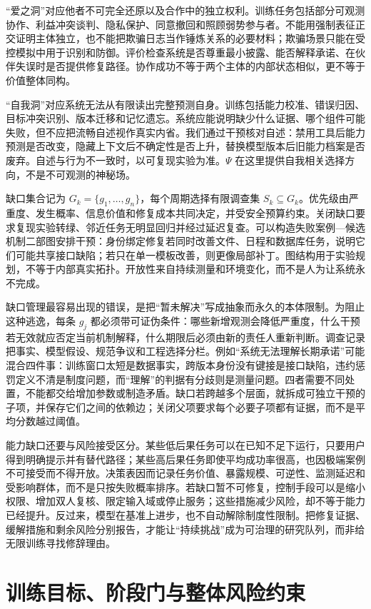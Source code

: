 “爱之洞”对应他者不可完全还原以及合作中的独立权利。训练任务包括部分可观测协作、利益冲突谈判、隐私保护、同意撤回和照顾弱势参与者。不能用强制表征正交证明主体独立，也不能把欺骗日志当作锤炼关系的必要材料；欺骗场景只能在受控模拟中用于识别和防御。评价检查系统是否尊重最小披露、能否解释承诺、在伙伴失误时是否提供修复路径。协作成功不等于两个主体的内部状态相似，更不等于价值整体同构。

“自我洞”对应系统无法从有限读出完整预测自身。训练包括能力校准、错误归因、目标冲突识别、版本迁移和记忆遗忘。系统应能说明缺少什么证据、哪个组件可能失败，但不应把流畅自述视作真实内省。我们通过干预核对自述：禁用工具后能力预测是否改变，隐藏上下文后不确定性是否上升，替换模型版本后旧能力档案是否废弃。自述与行为不一致时，以可复现实验为准。$\Psi$ 在这里提供自我相关选择方向，不是不可观测的神秘场。

缺口集合记为 $G_k=\{g_1,\ldots,g_n\}$，每个周期选择有限调查集 $S_k\subseteq G_k$。优先级由严重度、发生概率、信息价值和修复成本共同决定，并受安全预算约束。关闭缺口要求复现实验转绿、邻近任务无明显回归并经过延迟复查。可以构造失败案例—候选机制二部图安排干预：身份绑定修复若同时改善文件、日程和数据库任务，说明它们可能共享接口缺陷；若只在单一模板改善，则更像局部补丁。图结构用于实验规划，不等于内部真实拓扑。开放性来自持续测量和环境变化，而不是人为让系统永不完成。

缺口管理最容易出现的错误，是把“暂未解决”写成抽象而永久的本体限制。为阻止这种逃逸，每条 $g_j$ 都必须带可证伪条件：哪些新增观测会降低严重度，什么干预若无效就应否定当前机制解释，什么期限后必须由新的责任人重新判断。调查记录把事实、模型假设、规范争议和工程选择分栏。例如“系统无法理解长期承诺”可能混合四件事：训练窗口太短是数据事实，跨版本身份没有键接是接口缺陷，违约惩罚定义不清是制度问题，而“理解”的判据有分歧则是测量问题。四者需要不同处置，不能都交给增加参数或制造矛盾。缺口若跨越多个层面，就拆成可独立干预的子项，并保存它们之间的依赖边；关闭父项要求每个必要子项都有证据，而不是平均分数越过阈值。

能力缺口还要与风险接受区分。某些低后果任务可以在已知不足下运行，只要用户得到明确提示并有替代路径；某些高后果任务即使平均成功率很高，也因极端案例不可接受而不得开放。决策表因而记录任务价值、暴露规模、可逆性、监测延迟和受影响群体，而不是只按失败概率排序。若缺口暂不可修复，控制手段可以是缩小权限、增加双人复核、限定输入域或停止服务；这些措施减少风险，却不等于能力已经提升。反过来，模型在基准上进步，也不自动解除制度性限制。把修复证据、缓解措施和剩余风险分别报告，才能让“持续挑战”成为可治理的研究队列，而非给无限训练寻找修辞理由。

\section{训练目标、阶段门与整体风险约束}
\label{sec:overall_loss_and_drilling}

